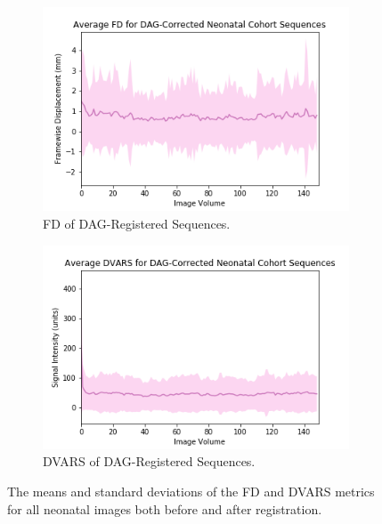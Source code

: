 \begin{figure}[t]
	\begin{subfigure}{0.4\textwidth}
		\centering
		\includegraphics[width=1.0\textwidth]{6/figures/neonates-dag-fd-150.png}
		\caption{FD of DAG-Registered Sequences.}
	\end{subfigure}
	\hspace{0.05\textwidth}
	\begin{subfigure}{0.4\textwidth}
		\centering
		\includegraphics[width=1.0\textwidth]{6/figures/neonates-dag-dvars-150.png}
		\caption{DVARS of DAG-Registered Sequences.}
	\end{subfigure}
\caption{The means and standard deviations of the FD and DVARS metrics for all neonatal images both before and after registration.}
\label{fig:neonate-power-dists}
\end{figure}

